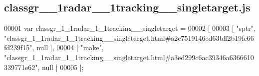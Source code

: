 \subsection{classgr\+\_\+\_\+1radar\+\_\+\_\+1tracking\+\_\+\+\_\+singletarget.\+js}
\label{classgr__1__1radar__1__1tracking____singletarget_8js_source}

\begin{DoxyCode}
00001 var classgr_1_1radar_1_1tracking__singletarget =
00002 [
00003     [ \textcolor{stringliteral}{"sptr"}, \textcolor{stringliteral}{"classgr\_1\_1radar\_1\_1tracking\_\_singletarget.html#a2c7519146ed63bff2b19fe66fd239f15"}, null ],
00004     [ \textcolor{stringliteral}{"make"}, \textcolor{stringliteral}{"classgr\_1\_1radar\_1\_1tracking\_\_singletarget.html#a3ed299c6ac39346a6366610339771e62"}, null ]
00005 ];
\end{DoxyCode}
